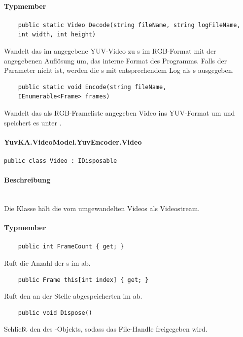 \paragraph{Typmember}
\begin{itemize}

	\begin{verbatim}
	public static Video Decode(string fileName, string logFileName,
    int width, int height)
	\end{verbatim}
	Wandelt das im  angegebene YUV-Video zu s im RGB-Format mit der angegebenen Auflösung um, das interne Format des Programms. Falls der Parameter  nicht  ist, werden die s mit entsprechendem Log als s ausgegeben.

	\begin{verbatim}
	public static void Encode(string fileName,
    IEnumerable<Frame> frames)
	\end{verbatim}
	Wandelt das als RGB-Frameliste angegeben Video ins YUV-Format um und speichert es unter . 

\end{itemize}

\setcounter{secnumdepth}{4}
\paragraph{YuvKA.VideoModel.YuvEncoder.Video}
\setcounter{secnumdepth}{3}

\begin{verbatim}
public class Video : IDisposable
\end{verbatim}

\paragraph{Beschreibung}~\\
Die Klasse  hält die vom  umgewandelten Videos als Videostream.

\paragraph{Typmember}
\begin{itemize}

	\begin{verbatim}
	public int FrameCount { get; }
	\end{verbatim}
	Ruft die Anzahl der s im  ab.

	\begin{verbatim}
	public Frame this[int index] { get; }
	\end{verbatim}
	Ruft den an der Stelle  abgespeicherten  im  ab.

	\begin{verbatim}
	public void Dispose()
	\end{verbatim}
	Schließt den  des -Objekts, sodass das File-Handle freigegeben wird.

\end{itemize}

